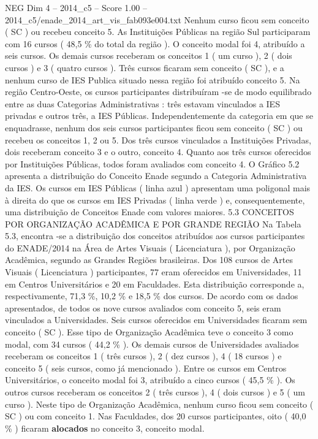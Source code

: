 \begin{textsample}{NEG Dim 4 – 2014\_c5 – Score 1.00 – 2014\_c5/enade\_2014\_art\_vis\_fab093e004.txt}
Nenhum curso ficou sem conceito ( SC ) ou recebeu conceito 5.
As Instituições Públicas na região Sul participaram com 16 cursos ( 48,5 \% do total da região ).
O conceito modal foi 4, atribuído a seis cursos.
Os demais cursos receberam os conceitos 1 ( um curso ), 2 ( dois cursos ) e 3 ( quatro cursos ).
Três cursos ficaram sem conceito ( SC ), e a nenhum curso de IES Publica situado nessa região foi atribuído conceito 5.
Na região Centro-Oeste, os cursos participantes distribuíram -se de modo equilibrado entre as duas Categorias Administrativas : três estavam vinculados a IES privadas e outros três, a IES Públicas.
Independentemente da categoria em que se enquadrasse, nenhum dos seis cursos participantes ficou sem conceito ( SC ) ou recebeu os conceitos 1, 2 ou 5.
Dos três cursos vinculados a Instituições Privadas, dois receberam conceito 3 e o outro, conceito 4.
Quanto aos três cursos oferecidos por Instituições Públicas, todos foram avaliados com conceito 4.
O Gráfico 5.2 apresenta a distribuição do Conceito Enade segundo a Categoria Administrativa da IES.
Os cursos em IES Públicas ( linha azul ) apresentam uma poligonal mais à direita do que os cursos em IES Privadas ( linha verde ) e, consequentemente, uma distribuição de Conceitos Enade com valores maiores. 5.3 CONCEITOS POR ORGANIZAÇÃO ACADÊMICA E POR GRANDE REGIÃO Na Tabela 5.3, encontra -se a distribuição dos conceitos atribuídos aos cursos participantes do ENADE/2014 na Área de Artes Visuais ( Licenciatura ), por Organização Acadêmica, segundo as Grandes Regiões brasileiras.
Dos 108 cursos de Artes Visuais ( Licenciatura ) participantes, 77 eram oferecidos em Universidades, 11 em Centros Universitários e 20 em Faculdades.
Esta distribuição corresponde a, respectivamente, 71,3 \%, 10,2 \% e 18,5 \% dos cursos.
De acordo com os dados apresentados, de todos os nove cursos avaliados com conceito 5, seis eram vinculados a Universidades.
Seis cursos oferecidos em Universidades ficaram sem conceito ( SC ).
Esse tipo de Organização Acadêmica teve o conceito 3 como modal, com 34 cursos ( 44,2 \% ).
Os demais cursos de Universidades avaliados receberam os conceitos 1 ( três cursos ), 2 ( dez cursos ), 4 ( 18 cursos ) e conceito 5 ( seis cursos, como já mencionado ).
Entre os cursos em Centros Universitários, o conceito modal foi 3, atribuído a cinco cursos ( 45,5 \% ).
Os outros cursos receberam os conceitos 2 ( três cursos ), 4 ( dois cursos ) e 5 ( um curso ).
Neste tipo de Organização Acadêmica, nenhum curso ficou sem conceito ( SC ) ou com conceito 1.
Nas Faculdades, dos 20 cursos participantes, oito ( 40,0 \% ) ficaram \textbf{alocados} no conceito 3, conceito modal.

\end{textsample}
